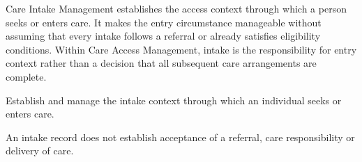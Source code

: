 Care Intake Management establishes the access context through which a person seeks or enters care. It makes the entry circumstance manageable without assuming that every intake follows a referral or already satisfies eligibility conditions. Within Care Access Management, intake is the responsibility for entry context rather than a decision that all subsequent care arrangements are complete.



Establish and manage the intake context through which an individual seeks or enters care.



An intake record does not establish acceptance of a referral, care responsibility or delivery of care.


